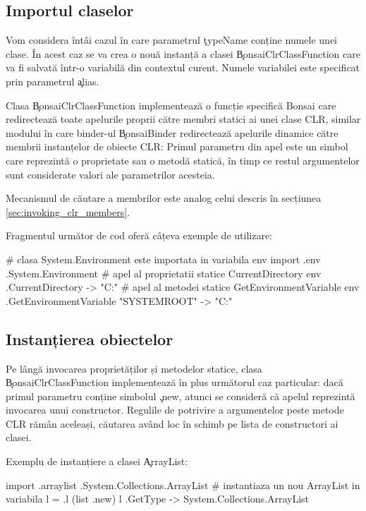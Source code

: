\documentclass[12pt,a4paper]{memoir}
\begin{document}
\subsection{Importul claselor}

Vom considera întâi cazul în care parametrul \c{typeName} conține numele unei clase. În acest caz se va crea o nouă instanță a clasei \c{BonsaiClrClassFunction} care va fi salvată într-o variabilă din contextul curent. Numele variabilei este specificat prin parametrul \c{alias}. 

Clasa \c{BonsaiClrClassFunction} implementează o funcție specifică Bonsai care redirectează toate apelurile proprii către membri statici ai unei clase CLR, similar modului în care binder-ul \c{BonsaiBinder} redirectează apelurile dinamice către membrii instanțelor de obiecte CLR: Primul parametru din apel este un simbol care reprezintă o proprietate sau o metodă statică, în timp ce restul argumentelor sunt considerate valori ale parametrilor acesteia. 

Mecanismul de căutare a membrilor este analog celui descris în secțiunea \ref{sec:invoking_clr_members}.

Fragmentul următor de cod oferă câțeva exemple de utilizare:
\begin{code}
# clasa System.Environment este importata in variabila env
import .env .System.Environment
# apel al proprietatii statice CurrentDirectory
env .CurrentDirectory
  -> "C:\Users\Eugen\Projects"
# apel al metodei statice GetEnvironmentVariable
env .GetEnvironmentVariable "SYSTEMROOT"
  -> "C:\Windows"
\end{code}

\subsection{Instanțierea obiectelor}

Pe lângă invocarea proprietăților și metodelor statice, clasa \c{BonsaiClrClassFunction} implementează în plus următorul caz particular: dacă primul parametru conține simbolul \c{.new}, atunci se consideră că apelul reprezintă invocarea unui constructor. Regulile de potrivire a argumentelor peste metode CLR rămân aceleași, căutarea având loc în schimb pe lista de constructori ai clasei.

Exemplu de instanțiere a clasei \c{ArrayList}:
\begin{code}
import .arraylist .System.Collections.ArrayList
# instantiaza un nou ArrayList in variabila l
= .l (list .new)
l .GetType
  -> System.Collections.ArrayList
\end{code}
\end{document}
